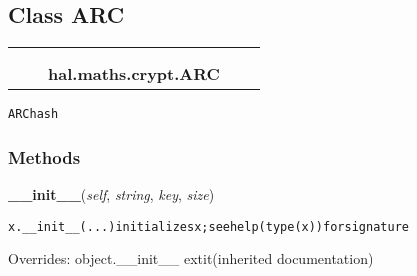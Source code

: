 

\subsection{Class ARC}

    \label{hal:maths:crypt:ARC}
\begin{tabular}{cccccc}
\multicolumn{2}{r}{\settowidth{\BCL}{object}\multirow{2}{\BCL}{object}}
&&
  \\\cline{3-3}
  &&\multicolumn{1}{c|}{}
&&
  \\
&&\multicolumn{2}{l}{\textbf{hal.maths.crypt.ARC}}
\end{tabular}

\begin{alltt}
ARC hash 
\end{alltt}



  \subsubsection{Methods}

    \vspace{0.5ex}

\hspace{.8\funcindent}\begin{boxedminipage}{\funcwidth}

    \raggedright \textbf{\_\_init\_\_}(\textit{self}, \textit{string}, \textit{key}, \textit{size})

\setlength{\parskip}{2ex}
\begin{alltt}
x.\_\_init\_\_(...) initializes x; see help(type(x)) for signature
\end{alltt}

\setlength{\parskip}{1ex}
      Overrides: object.\_\_init\_\_ 	extit{(inherited documentation)}

    \end{boxedminipage}

